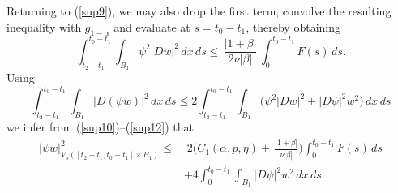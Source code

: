 \documentclass[10pt]{article}
\begin{document}
Returning to (\ref{sup9}), we may also drop the first term, convolve
the resulting inequality with $g_{1-\alpha}$ and evaluate at
$s=t_0-t_1$, thereby obtaining
\begin{equation} \label{sup12}
\int_{t_2-t_1}^{t_0-t_1}\int_{B_1}\psi^2|Dw|^2\,dx\,ds \le
\,\frac{|1+\beta|}{2\nu |\beta|}\,\int_0^{t_0-t_1} \!\!\!\!F(s)\,ds.
\end{equation}
Using
\[
\int_{t_2-t_1}^{t_0-t_1}\int_{B_1} |D(\psi w)|^2\,dx\,ds\le
2\int_{t_2-t_1}^{t_0-t_1}\int_{B_1}
\big(\psi^2|Dw|^2+|D\psi|^2w^2\big)\,dx\,ds
\]
we infer from (\ref{sup10})--(\ref{sup12}) that
\begin{align}
|\psi w|^2_{V_p([t_2-t_1,t_0-t_1]\times B_1)}\le &\;
2\Big(C_1(\alpha,p,\eta)+\,\frac{|1+\beta|}{\nu|\beta|}\Big)\int_0^{t_0-t_1}
\!\!\!\!F(s)\,ds\nonumber\\
&+4\int_{0}^{t_0-t_1}\int_{B_1} |D\psi|^2w^2\,dx\,ds.
\label{vpest}
\end{align}
\end{document}
